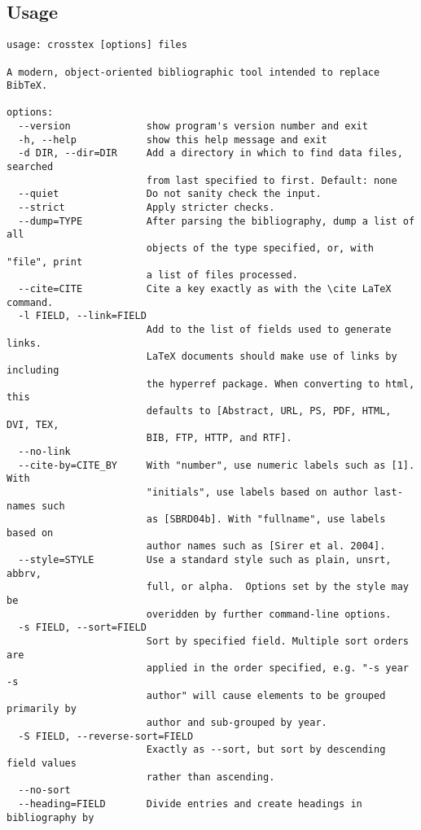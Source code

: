 \documentclass{article}
\begin{document}
\subsection{Usage}

\begin{small}\begin{verbatim}
usage: crosstex [options] files

A modern, object-oriented bibliographic tool intended to replace BibTeX.

options:
  --version             show program's version number and exit
  -h, --help            show this help message and exit
  -d DIR, --dir=DIR     Add a directory in which to find data files, searched
                        from last specified to first. Default: none
  --quiet               Do not sanity check the input.
  --strict              Apply stricter checks.
  --dump=TYPE           After parsing the bibliography, dump a list of all
                        objects of the type specified, or, with "file", print
                        a list of files processed.
  --cite=CITE           Cite a key exactly as with the \cite LaTeX command.
  -l FIELD, --link=FIELD
                        Add to the list of fields used to generate links.
                        LaTeX documents should make use of links by including
                        the hyperref package. When converting to html, this
                        defaults to [Abstract, URL, PS, PDF, HTML, DVI, TEX,
                        BIB, FTP, HTTP, and RTF].
  --no-link             
  --cite-by=CITE_BY     With "number", use numeric labels such as [1]. With
                        "initials", use labels based on author last-names such
                        as [SBRD04b]. With "fullname", use labels based on
                        author names such as [Sirer et al. 2004].
  --style=STYLE         Use a standard style such as plain, unsrt, abbrv,
                        full, or alpha.  Options set by the style may be
                        overidden by further command-line options.
  -s FIELD, --sort=FIELD
                        Sort by specified field. Multiple sort orders are
                        applied in the order specified, e.g. "-s year -s
                        author" will cause elements to be grouped primarily by
                        author and sub-grouped by year.
  -S FIELD, --reverse-sort=FIELD
                        Exactly as --sort, but sort by descending field values
                        rather than ascending.
  --no-sort             
  --heading=FIELD       Divide entries and create headings in bibliography by

\end{verbatim}
\end{small}
\end{document}
